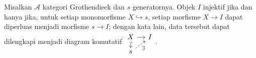 \begin{lema}\label{prop:Grothendieck-injective-criterion}
Misalkan $\mathcal{A}$ kategori Grothendieck dan $s$ generatornya. Objek $I$
injektif jika dan hanya jika, untuk setiap monomorfisme $X\hookrightarrow s$,
setiap morfisme $X\to I$ dapat diperluas menjadi morfisme $s\to I$; dengan
kata lain, data tersebut dapat dilengkapi menjadi diagram komutatif
$\begin{tikzcd}[row sep=small,column sep=small]
	X\arrow[r]\arrow[hookrightarrow,d]&I\\
	s\arrow[dashed,ru,"\exists"']&
\end{tikzcd}$.
\end{lema}
